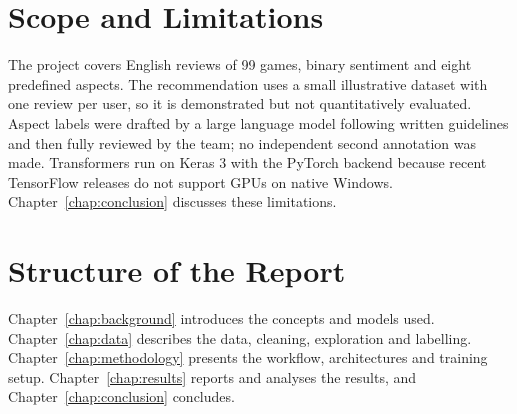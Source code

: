 \section{Scope and Limitations}

The project covers English reviews of 99 games, binary sentiment and eight predefined aspects. The recommendation uses a small illustrative dataset with one review per user, so it is demonstrated but not quantitatively evaluated. Aspect labels were drafted by a large language model following written guidelines and then fully reviewed by the team; no independent second annotation was made. Transformers run on Keras 3 with the PyTorch backend because recent TensorFlow releases do not support GPUs on native Windows. Chapter~\ref{chap:conclusion} discusses these limitations.

\section{Structure of the Report}

Chapter~\ref{chap:background} introduces the concepts and models used. Chapter~\ref{chap:data} describes the data, cleaning, exploration and labelling. Chapter~\ref{chap:methodology} presents the workflow, architectures and training setup. Chapter~\ref{chap:results} reports and analyses the results, and Chapter~\ref{chap:conclusion} concludes.
